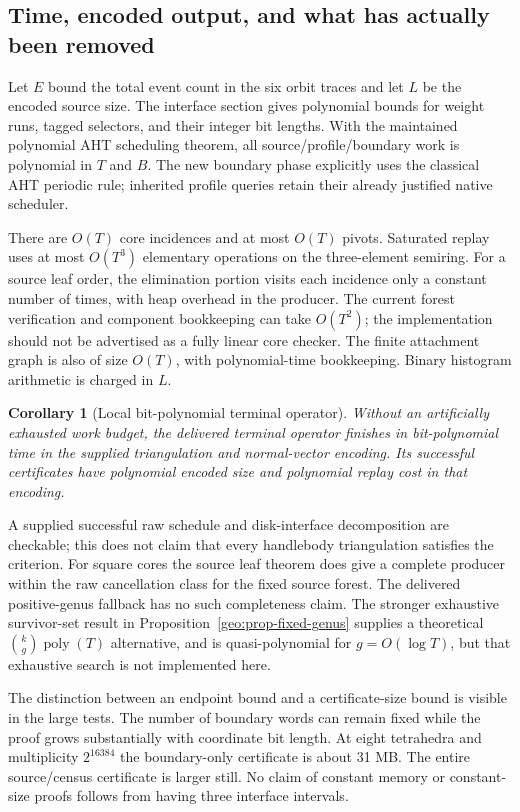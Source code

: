 \documentclass[11pt,a4paper]{article}
\newtheorem{corollary}[theorem]{Corollary}
\theoremstyle{definition}
\newcommand{\poly}{\operatorname{poly}}
\begin{document}
\subsection{Time, encoded output, and what has actually been removed}

Let $E$ bound the total event count in the six orbit traces and let $L$ be
the encoded source size.  The interface section gives polynomial bounds for
weight runs, tagged selectors, and their integer bit lengths.  With the
maintained polynomial AHT scheduling theorem, all source/profile/boundary
work is polynomial in $T$ and $B$.  The new boundary phase explicitly uses
the classical AHT periodic rule; inherited profile queries retain their
already justified native scheduler.

There are $O(T)$ core incidences and at most $O(T)$ pivots.  Saturated replay
uses at most $O(T^3)$ elementary operations on the three-element semiring.
For a source leaf order, the elimination portion visits each incidence only
a constant number of times, with heap overhead in the producer.  The current
forest verification and component bookkeeping can take $O(T^2)$; the
implementation should not be advertised as a fully linear core checker.
The finite attachment graph is also of size $O(T)$, with polynomial-time
bookkeeping.  Binary histogram arithmetic is charged in $L$.

\begin{corollary}[Local bit-polynomial terminal operator]
\label{main:polyconsumer}
Without an artificially exhausted work budget, the delivered terminal
operator finishes in bit-polynomial time in the supplied triangulation and
normal-vector encoding.  Its successful certificates have polynomial
encoded size and polynomial replay cost in that encoding.
\end{corollary}

A supplied successful raw schedule and disk-interface decomposition are
checkable; this does not claim that every handlebody triangulation satisfies
the criterion.  For square cores the source leaf theorem does give a complete
producer within the raw cancellation class for the fixed source forest.
The delivered positive-genus fallback has no such completeness claim.  The
stronger exhaustive survivor-set result in
Proposition~\ref{geo:prop-fixed-genus} supplies a theoretical
$\binom{k}{g}\poly(T)$ alternative, and is quasi-polynomial for
$g=O(\log T)$, but that exhaustive search is not implemented here.

The distinction between an endpoint bound and a certificate-size bound is
visible in the large tests.  The number of boundary words can remain fixed
while the proof grows substantially with coordinate bit length.  At eight
tetrahedra and multiplicity $2^{16384}$ the boundary-only certificate is about
31 MB.  The entire source/census certificate is larger still.  No claim of
constant memory or constant-size proofs follows from having three interface
intervals.
\end{document}
